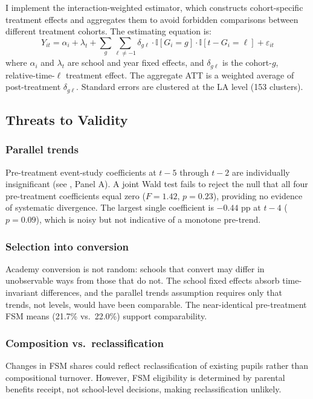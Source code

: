\documentclass[12pt]{article}
\newcommand{\ind}{\mathbb{I}}
\begin{document}
I implement the \citet{sunAbraham2021} interaction-weighted estimator, which constructs cohort-specific treatment effects and aggregates them to avoid forbidden comparisons between different treatment cohorts. The estimating equation is:
\begin{equation}
Y_{it} = \alpha_i + \lambda_t + \sum_{g} \sum_{\ell \neq -1} \delta_{g\ell} \cdot \ind[G_i = g] \cdot \ind[t - G_i = \ell] + \varepsilon_{it}
\end{equation}
where $\alpha_i$ and $\lambda_t$ are school and year fixed effects, and $\delta_{g\ell}$ is the cohort-$g$, relative-time-$\ell$ treatment effect. The aggregate ATT is a weighted average of post-treatment $\delta_{g\ell}$. Standard errors are clustered at the LA level (153 clusters).

\subsection{Threats to Validity}

\subsubsection*{Parallel trends} Pre-treatment event-study coefficients at $t-5$ through $t-2$ are individually insignificant (see , Panel A). A joint Wald test fails to reject the null that all four pre-treatment coefficients equal zero ($F = 1.42$, $p = 0.23$), providing no evidence of systematic divergence. The largest single coefficient is $-0.44$ pp at $t-4$ ($p = 0.09$), which is noisy but not indicative of a monotone pre-trend.

\subsubsection*{Selection into conversion} Academy conversion is not random: schools that convert may differ in unobservable ways from those that do not. The school fixed effects absorb time-invariant differences, and the parallel trends assumption requires only that trends, not levels, would have been comparable. The near-identical pre-treatment FSM means (21.7\% vs.\ 22.0\%) support comparability.

\subsubsection*{Composition vs.\ reclassification} Changes in FSM shares could reflect reclassification of existing pupils rather than compositional turnover. However, FSM eligibility is determined by parental benefits receipt, not school-level decisions, making reclassification unlikely.
\end{document}
